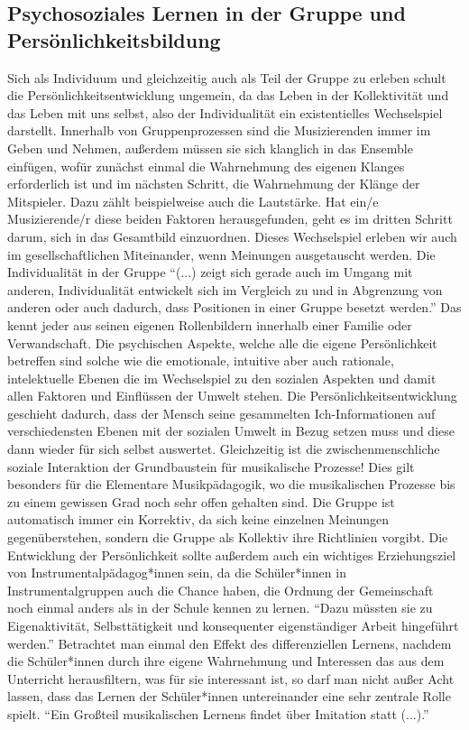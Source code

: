 \subsection{Psychosoziales Lernen in der Gruppe und Persönlichkeitsbildung}
Sich als Individuum und gleichzeitig auch als Teil der Gruppe zu erleben schult
die Persönlichkeitsentwicklung ungemein, da das Leben in der Kollektivität und
das Leben mit uns selbst, also der Individualität ein existentielles
Wechselspiel darstellt. Innerhalb von Gruppenprozessen sind die Musizierenden
immer im Geben und Nehmen, außerdem müssen sie sich klanglich in das Ensemble
einfügen, wofür zunächst einmal die Wahrnehmung des eigenen Klanges erforderlich
ist und im nächsten Schritt, die Wahrnehmung der Klänge der Mitspieler. Dazu
zählt beispielweise auch die Lautstärke. Hat ein/e Musizierende/r diese beiden
Faktoren herausgefunden, geht es im dritten Schritt darum, sich in das
Gesamtbild einzuordnen. Dieses Wechselspiel erleben wir auch im
gesellschaftlichen Miteinander, wenn Meinungen ausgetauscht werden. Die
Individualität in der Gruppe \enquote{(...) zeigt sich gerade auch im Umgang mit
anderen, Individualität entwickelt sich im Vergleich zu und in Abgrenzung von
anderen oder auch dadurch, dass Positionen in einer Gruppe besetzt
werden.}\autocite[95]{ribke:emp} Das kennt jeder aus seinen eigenen
Rollenbildern innerhalb einer Familie oder Verwandschaft. Die psychischen
Aspekte, welche alle die eigene Persönlichkeit betreffen sind solche wie die
emotionale, intuitive aber auch rationale, intelektuelle Ebenen die im
Wechselspiel zu den sozialen Aspekten und damit allen Faktoren und Einflüssen
der Umwelt stehen. Die Persönlichkeitsentwicklung geschieht dadurch, dass der
Mensch seine gesammelten Ich-Informationen auf verschiedensten Ebenen mit der
sozialen Umwelt in Bezug setzen muss und diese dann wieder für sich selbst
auswertet. Gleichzeitig ist die zwischenmenschliche soziale Interaktion der
Grundbaustein für musikalische Prozesse! Dies gilt besonders für die Elementare
Musikpädagogik, wo die musikalischen Prozesse bis zu einem gewissen Grad noch
sehr offen gehalten sind. Die Gruppe ist automatisch immer ein Korrektiv, da
sich keine einzelnen Meinungen gegenüberstehen, sondern die Gruppe als Kollektiv
ihre Richtlinien vorgibt. Die Entwicklung der Persönlichkeit sollte außerdem
auch ein wichtiges Erziehungsziel von Instrumentalpädagog*innen sein, da die
Schüler*innen in Instrumentalgruppen auch die Chance haben, die Ordnung der
Gemeinschaft noch einmal anders als in der Schule kennen zu lernen.
\enquote{Dazu müssten sie zu Eigenaktivität, Selbsttätigkeit und konsequenter
eigenständiger Arbeit hingeführt
werden.}\autocite[64]{losert:die_kunst_zu_unterrichten} Betrachtet man einmal
den Effekt des differenziellen Lernens, nachdem die Schüler*innen durch ihre
eigene Wahrnehmung und Interessen das aus dem Unterricht herausfiltern, was für
sie interessant ist, so darf man nicht außer Acht lassen, dass das Lernen der
Schüler*innen untereinander eine sehr zentrale Rolle spielt. \enquote{Ein
Großteil musikalischen Lernens findet über Imitation statt
(...).}\autocite[98]{doerne:umfassend_musizieren}


